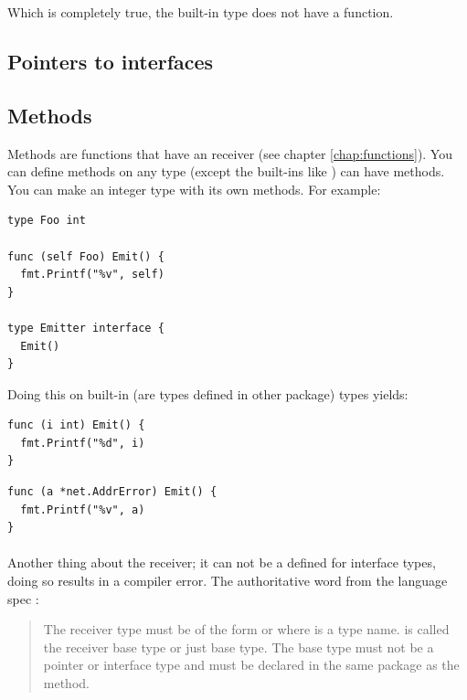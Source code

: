 \noindent{}

\noindent{}Which is completely true, the built-in type  does not
have a  function.

\subsection{Pointers to interfaces}

\subsection{Methods}
Methods are functions that have an receiver (see chapter
\ref{chap:functions}).
You can define methods on any type (except the built-ins like
) can have methods. 
You can make an integer type with its own methods. For example:
\begin{lstlisting}
type Foo int

func (self Foo) Emit() {
  fmt.Printf("%v", self)
}

type Emitter interface {
  Emit()
}
\end{lstlisting}

Doing this on built-in (are types defined in other package) types yields:

\begin{minipage}{.5\textwidth}
\begin{lstlisting}[linewidth=.7\textwidth,caption=Failure extending built-in types]
func (i int) Emit() {
  fmt.Printf("%d", i)
}
\end{lstlisting}
\noindent{}
\end{minipage}
\begin{minipage}{.5\textwidth}
\begin{lstlisting}[caption=Failure extending non-local types]
func (a *net.AddrError) Emit() {
  fmt.Printf("%v", a)
}
\end{lstlisting}
\noindent{}
\end{minipage}

\paragraph{}  %
Another thing about the receiver; it can not be a defined for interface
types, doing so results in a  compiler
error. The authoritative word from the language spec \cite{go_spec}:
\begin{quote}
The receiver type must be of the form  or  where
 is a type name.  is called the receiver base type or just base 
type. The base type must
not be a pointer or interface type and must be declared in the same
package as the method.
\end{quote}


